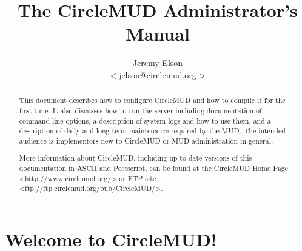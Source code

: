 \documentclass[11pt]{article}
\title{The CircleMUD Administrator's Manual}
\author{Jeremy Elson\\
$<$jelson@circlemud.org$>$}
\begin{document}
\maketitle

\begin{abstract}
This document describes how to configure CircleMUD and how to compile it for the first time.  It also discusses how to run the server including documentation of command-line options, a description of system logs and how to use them, and a description of daily and long-term maintenance required by the MUD. The intended audience is implementors new to CircleMUD or MUD administration in general.
\par
More information about CircleMUD, including up-to-date versions of this documentation in ASCII and Postscript, can be found at the CircleMUD Home Page \url{<http://www.circlemud.org/>} or FTP site \url{<ftp://ftp.circlemud.org/pub/CircleMUD/>}.
\end{abstract}

\tableofcontents

\section{Welcome to CircleMUD!}
\end{document}
